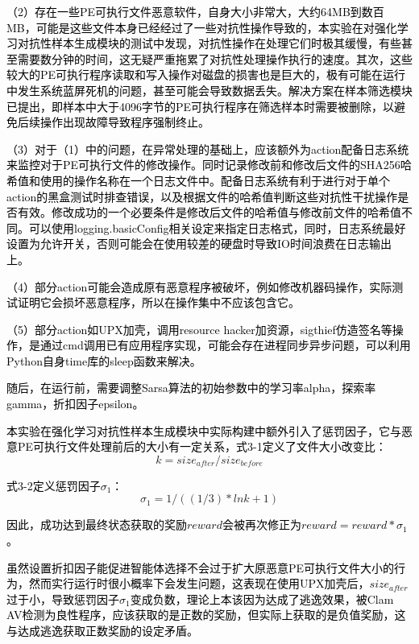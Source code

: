 \textcolor{black}{（2）存在一些PE可执行文件恶意软件，自身大小非常大，大约64MB到数百MB，可能是这些文件本身已经经过了一些对抗性操作导致的，本实验在对强化学习对抗性样本生成模块的测试中发现，对抗性操作在处理它们时极其缓慢，有些甚至需要数分钟的时间，这无疑严重拖累了对抗性处理操作执行的速度。其次，这些较大的PE可执行程序读取和写入操作对磁盘的损害也是巨大的，极有可能在运行中发生系统蓝屏死机的问题，甚至可能会导致数据丢失。解决方案在样本筛选模块已提出，即样本中大于4096字节的PE可执行程序在筛选样本时需要被删除，以避免后续操作出现故障导致程序强制终止。}

\textcolor{black}{（3）对于（1）中的问题，在异常处理的基础上，应该额外为action配备日志系统来监控对于PE可执行文件的修改操作。同时记录修改前和修改后文件的SHA256哈希值和使用的操作名称在一个日志文件中。配备日志系统有利于进行对于单个action的黑盒测试时排查错误，以及根据文件的哈希值判断这些对抗性干扰操作是否有效。修改成功的一个必要条件是修改后文件的哈希值与修改前文件的哈希值不同。可以使用logging.basicConfig相关设定来指定日志格式，同时，日志系统最好设置为允许开关，否则可能会在使用较差的硬盘时导致IO时间浪费在日志输出上。}

\textcolor{black}{（4）部分action可能会造成原有恶意程序被破坏，例如修改机器码操作，实际测试证明它会损坏恶意程序，所以在操作集中不应该包含它。}

\textcolor{black}{（5）部分action如UPX加壳，调用resource hacker加资源，sigthief仿造签名等操作，是通过cmd调用已有应用程序实现，可能会存在进程同步异步问题，可以利用Python自身time库的sleep函数来解决。}

\textcolor{black}{随后，在运行前，需要调整Sarsa算法的初始参数中的学习率alpha，探索率gamma，折扣因子epsilon。}

\textcolor{black}{本实验在强化学习对抗性样本生成模块中实际构建中额外引入了惩罚因子，它与恶意PE可执行文件处理前后的大小有一定关系，式3-1定义了文件大小改变比：}
\begin{equation}
    k=size_{after}/size_{before}
\end{equation}

\textcolor{black}{式3-2定义惩罚因子$\sigma_{1}$：}
\begin{equation}
    \sigma_{1}=1/((1/3)*lnk+1)
\end{equation}

\textcolor{black}{因此，成功达到最终状态获取的奖励$reward$会被再次修正为$reward=reward*\sigma_{1}$。}

\textcolor{black}{虽然设置折扣因子能促进智能体选择不会过于扩大原恶意PE可执行文件大小的行为，然而实行运行时很小概率下会发生问题，这表现在使用UPX加壳后，$size_{after}$过于小，导致惩罚因子$\sigma_{1}$变成负数，理论上本该因为达成了逃逸效果，被Clam AV检测为良性程序，应该获取的是正数的奖励，但实际上获取的是负值奖励，这与达成逃逸获取正数奖励的设定矛盾。}

